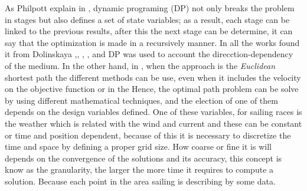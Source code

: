 As Philpott explain in \cite{philpott2001optimising}, dynamic programing (DP) not only breaks the problem in stages but also defines a set of state variables; as a result, each stage can be linked to the previous results, after this the next stage can be determine, it can say that the optimization is made in a recursively manner.
In all the works found it from Dolinskaya ,\cite{dolinskaya2012optimal}, \cite{dolinskaya2012path}, \cite{dolinskaya2013fastest},\cite{dolinskaya2012time} and \cite{dolinskaya2009optimal} DP was used to account the direcction-dependency of the medium. In the other hand, in \cite{mitchell2000geometric},  when the approach is the \textit{Euclidean} shortest path the different methods can be use, even when it includes the velocity on the objective function or in the 
Hence, the optimal path problem can be solve by using different mathematical techniques, and the election of one of them depends on the design variables defined. One of these variables, for sailing races is the weather which is related with the wind  and current and these can be constant or time and position dependent, because of this it is necessary to discretize the time and space by defining a proper grid size. How coarse or fine it is will depends on the convergence of the solutions and its accuracy, this concept is know as the granularity, the larger the more time it requires to compute a solution. Because  each point in the area sailing is describing by some data.%
